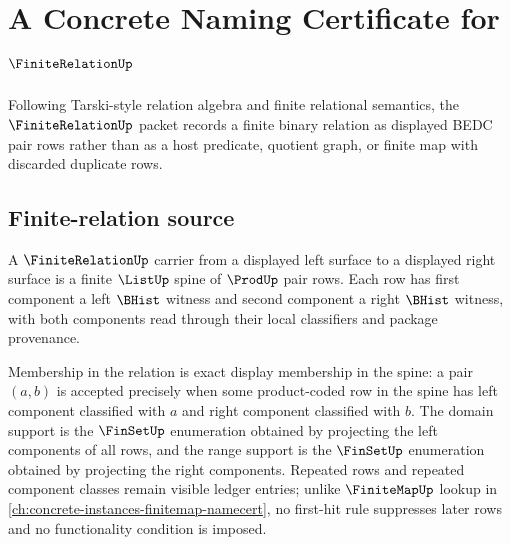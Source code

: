 \chapter{A Concrete Naming Certificate for $\FiniteRelationUp$}
\label{ch:concrete-instances-finite-relation-namecert}


Following Tarski-style relation algebra and finite relational semantics, the $\FiniteRelationUp$ packet records a finite binary relation as displayed BEDC pair rows rather than as a host predicate, quotient graph, or finite map with discarded duplicate rows.

\section{Finite-relation source}
\label{sec:finite-relation-source}

\begin{definition}
\label{def:finite-relation-carrier}
A $\FiniteRelationUp$ carrier from a displayed left surface to a displayed right surface is a finite $\ListUp$ spine of $\ProdUp$ pair rows. Each row has first component a left $\BHist$ witness and second component a right $\BHist$ witness, with both components read through their local classifiers and package provenance.

Membership in the relation is exact display membership in the spine: a pair $(a,b)$ is accepted precisely when some product-coded row in the spine has left component classified with $a$ and right component classified with $b$. The domain support is the $\FinSetUp$ enumeration obtained by projecting the left components of all rows, and the range support is the $\FinSetUp$ enumeration obtained by projecting the right components. Repeated rows and repeated component classes remain visible ledger entries; unlike $\FiniteMapUp$ lookup in \autoref{ch:concrete-instances-finitemap-namecert}, no first-hit rule suppresses later rows and no functionality condition is imposed.
\end{definition}

